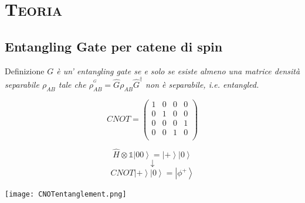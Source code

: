 \documentclass[xcolor=x11names,compress]{beamer}
\renewcommand{\(}{\begin{columns}}
\renewcommand{\)}{\end{columns}}
\newcommand{\<}[1]{\begin{column}{#1}}
\renewcommand{\>}{\end{column}}
\begin{document}
\section{\scshape Teoria}
\subsection{Entangling Gate per catene di spin}
\begin{frame}

\begin{block}{\textcolor{DeepSkyBlue4}{Definizione}}
\textit{$G$ è un' entangling gate se e solo se esiste almeno una matrice densità separabile $\rho_{AB}$ tale che $\rho^{^G}_{AB}= \hat{G} \rho_{AB} \hat{G}^{\dag}$ non è separabile, i.e. entangled.}
\end{block}

\begin{example}
\begin{multicols}{2}
$$CNOT = \begin{pmatrix}1 & 0 & 0 & 0\\0 & 1 & 0 & 0\\0 & 0 & 0 & 1\\0 & 0 & 1 & 0\\\end{pmatrix}$$

\columnbreak

$$
\hat{H} \otimes \mathbb{1} \left| 0  0 \right\rangle = \left| + \right\rangle \left| 0 \right\rangle
$$
$$\downarrow$$
$$
CNOT \left| + \right\rangle \left| 0 \right\rangle = \left| \phi^+ \right\rangle 
$$
\end{multicols}
\vspace{0.08cm}
\begin{center}
\texttt{[image: CNOTentanglement.png]}
\end{center}
\end{example}


\end{frame}


\end{document}
